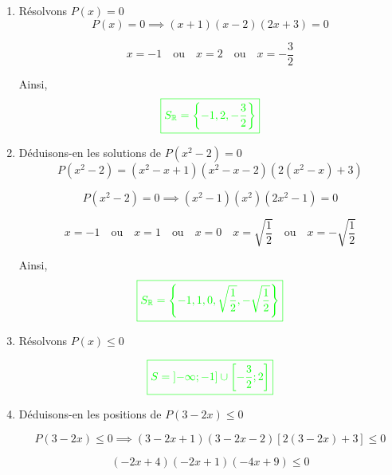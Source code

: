 \documentclass[12pt,a4paper]{article}
\begin{document}
\begin{enumerate}
\item Résolvons \( P(x) = 0 \)
\[
P(x) = 0 \implies (x+1)(x-2)(2x+3) = 0
\]
  
\[
x = -1 \quad \text{ou} \quad x = 2 \quad \text{ou} \quad x = -\frac{3}{2}
\]

Ainsi,  
\[
\textcolor{green}{\boxed{S_{\mathbb{R}} = \left\{ -1, 2, -\frac{3}{2} \right\}}}
\]

\item Déduisons-en les solutions de \( P(x^2 - 2) = 0 \)
\[
P(x^2 - 2) = (x^2 - x + 1)(x^2 - x - 2)(2(x^2 - x) + 3)
\]

\[
P(x^2 - 2) = 0 \implies (x^2 - 1)(x^2)(2x^2 - 1) = 0
\]
 
\[
x = -1 \quad \text{ou} \quad x = 1 \quad \text{ou} \quad x=0 \quad x = \sqrt{\frac{1}{2}} \quad \text{ou} \quad x = -\sqrt{\frac{1}{2}}
\]

Ainsi,  
\[
\textcolor{green}{\boxed{S_{\mathbb{R}} = \left\{ -1, 1, 0, \sqrt{\frac{1}{2}}, -\sqrt{\frac{1}{2}} \right\}}} 
\]

\item  Résolvons \( P(x) \leq 0 \)

\begin{center}
\end{center}
\[
\textcolor{green}{\boxed{S = \left] -\infty ; -1\right] \cup \left[ -\frac{3}{2};2\right] }} 
\]
\item Déduisons-en les positions de \( P(3-2x) \leq 0 \)

\[
P(3-2x) \leq 0 \implies 
\left( 3 - 2x + 1 \right)\left( 3 - 2x - 2 \right)\left[ 2\left( 3 - 2x \right) + 3 \right] \leq 0
\]

\[
\left( -2x + 4 \right)\left( -2x + 1 \right)\left( -4x + 9 \right) \leq 0
\]
\begin{center}
\end{center}
\end{enumerate}
\end{document}
